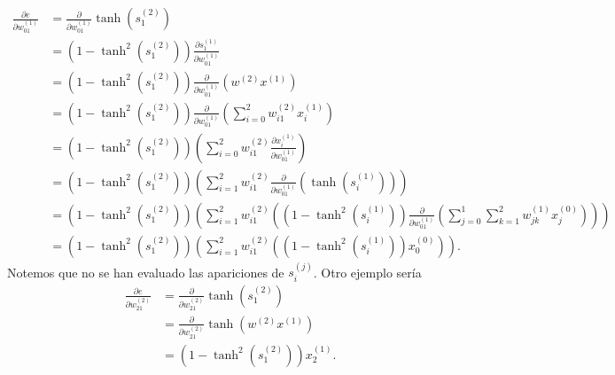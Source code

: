 \begin{align}
    \frac{\partial e}{\partial w^{(1)}_{01}} 
    &= 
    \frac{\partial }{\partial w^{(1)}_{01}}
         \tanh \left(s^{(2)}_{1}\right)
    \\
    &= 
    \left(1- \tanh^2 \left(s^{(2)}_{1}\right)\right) 
    \frac{\partial s^{(1)}_{1}}{\partial w^{(1)}_{01}}
    \\
    &= 
    \left(1- \tanh^2 \left(s^{(2)}_{1}\right)\right) 
    \frac{\partial }{\partial w^{(1)}_{01}}
    \left(w^{(2)}x^{(1)}\right)
    \\
    &= 
    \left(1- \tanh^2 \left(s^{(2)}_{1}\right)\right) 
    \frac{\partial }{\partial w^{(1)}_{01}}
    \left(
        \sum^2_{i=0}
        w^{(2)}_{i1}x^{(1)}_i
    \right)
    \\
    &= 
    \left(1- \tanh^2 \left(s^{(2)}_{1}\right)\right) 
    \left(
        \sum^2_{i=0}
        w^{(2)}_{i1}\frac{\partial x^{(1)}_i }{\partial w^{(1)}_{01}}
    \right)
    \\
    &= 
    \left(1- \tanh^2 \left(s^{(2)}_{1}\right)\right) 
    \left(
        \sum^2_{i=1}
        w^{(2)}_{i1}\frac{\partial }{\partial w^{(1)}_{01}}
        \left(
            \tanh \left(s^{(1)}_{i}\right)
        \right)
    \right)
    \\
    &= 
    \left(1- \tanh^2 \left(s^{(2)}_{1}\right)\right) 
    \left(
        \sum^2_{i=1}
        w^{(2)}_{i1}
        \left(
            \left(1- \tanh^2 \left(s^{(1)}_{i}\right)\right)
            \frac{\partial  }{\partial w^{(1)}_{01}}
            \left(
                \sum^1_{j=0}\sum^2_{k=1}
                w^{(1)}_{jk}x^{(0)}_j
            \right)
        \right)
    \right)
    \\
    &= 
    \left(1- \tanh^2 \left(s^{(2)}_{1}\right)\right) 
    \left(
        \sum^2_{i=1}
        w^{(2)}_{i1}
        \left(
            \left(1- \tanh^2 \left(s^{(1)}_{i}\right)\right)
            x^{(0)}_0
        \right)
    \right).
\end{align}
Notemos que no se han evaluado las apariciones de $s_i^{(j)}$.
Otro ejemplo sería
\begin{align}
    \frac{\partial e}{\partial w^{(2)}_{21}} 
    &=
    \frac{\partial }{\partial w^{(2)}_{21}}
         \tanh \left(s^{(2)}_{1}\right)
    \\
    &= 
    \frac{\partial }{\partial w^{(2)}_{21}}
         \tanh \left(w^{(2)}x^{(1)}\right)
    \\
    &= \left(
    1- \tanh^2 \left(s^{(2)}_{1}\right) \right)x^{(1)}_2.
\end{align}

